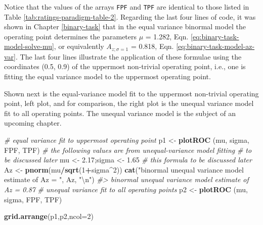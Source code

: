 \documentclass[
]{book}
\newenvironment{Shaded}{\begin{snugshade}}{\end{snugshade}}
\newcommand{\CharTok}[1]{\textcolor[rgb]{0.31,0.60,0.02}{#1}}
\newcommand{\CommentTok}[1]{\textcolor[rgb]{0.56,0.35,0.01}{\textit{#1}}}
\newcommand{\DataTypeTok}[1]{\textcolor[rgb]{0.13,0.29,0.53}{#1}}
\newcommand{\DecValTok}[1]{\textcolor[rgb]{0.00,0.00,0.81}{#1}}
\newcommand{\FloatTok}[1]{\textcolor[rgb]{0.00,0.00,0.81}{#1}}
\newcommand{\KeywordTok}[1]{\textcolor[rgb]{0.13,0.29,0.53}{\textbf{#1}}}
\newcommand{\NormalTok}[1]{#1}
\newcommand{\OperatorTok}[1]{\textcolor[rgb]{0.81,0.36,0.00}{\textbf{#1}}}
\newcommand{\StringTok}[1]{\textcolor[rgb]{0.31,0.60,0.02}{#1}}
\begin{document}
Notice that the values of the arrays \texttt{FPF} and \texttt{TPF} are identical to those listed in Table \ref{tab:ratings-paradigm-table-2}. Regarding the last four lines of code, it was shown in Chapter \ref{binary-task} that in the equal variance binormal model the operating point determines the parameters \(\mu\) = 1.282, Eqn. \eqref{eq:binary-task-model-solve-mu}, or equivalently \(A_{z;\sigma = 1}\) = 0.818, Eqn. \eqref{eq:binary-task-model-az-var}. The last four lines illustrate the application of these formulae using the coordinates (0.5, 0.9) of the uppermost non-trivial operating point, i.e., one is fitting the equal variance model to the uppermost operating point.

Shown next is the equal-variance model fit to the uppermost non-trivial operating point, left plot, and for comparison, the right plot is the unequal variance model fit to all operating points. The unequal variance model is the subject of an upcoming chapter.

\begin{Shaded}
\begin{Highlighting}[]
\CommentTok{# equal variance fit to uppermost operating point}
\NormalTok{p1 <-}\StringTok{ }\KeywordTok{plotROC}\NormalTok{ (mu, sigma, FPF, TPF)}
\CommentTok{# the following values are from unequal-variance model fitting}
\CommentTok{# to be discussed later}
\NormalTok{mu <-}\StringTok{ }\FloatTok{2.17}\NormalTok{;sigma <-}\StringTok{ }\FloatTok{1.65}
\CommentTok{# this formula to be discussed later}
\NormalTok{Az <-}\StringTok{ }\KeywordTok{pnorm}\NormalTok{(mu}\OperatorTok{/}\KeywordTok{sqrt}\NormalTok{(}\DecValTok{1}\OperatorTok{+}\NormalTok{sigma}\OperatorTok{^}\DecValTok{2}\NormalTok{))}
\KeywordTok{cat}\NormalTok{(}\StringTok{"binormal unequal variance model estimate of Az = "}\NormalTok{, Az, }\StringTok{"}\CharTok{\textbackslash{}n}\StringTok{"}\NormalTok{)}
\CommentTok{#> binormal unequal variance model estimate of Az =  0.87}
\CommentTok{# unequal variance fit to all operating points}
\NormalTok{p2 <-}\StringTok{ }\KeywordTok{plotROC}\NormalTok{ (mu, sigma, FPF, TPF)}
\end{Highlighting}
\end{Shaded}

\begin{Shaded}
\begin{Highlighting}[]
\KeywordTok{grid.arrange}\NormalTok{(p1,p2,}\DataTypeTok{ncol=}\DecValTok{2}\NormalTok{)}
\end{Highlighting}
\end{Shaded}
\end{document}
